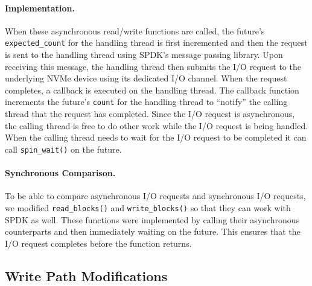 \paragraph{Implementation.}
When these asynchronous read/write functions are called, the future's {\tt
expected\_count} for the handling thread is first incremented and then the
request is sent to the handling thread using SPDK's message passing library.
Upon receiving this message, the handling thread then submits the I/O request
to the underlying NVMe device using its dedicated I/O channel. When the request
completes, a callback is executed on the handling thread. The callback function
increments the future's {\tt count} for the handling thread to ``notify'' the
calling thread that the request has completed. Since the I/O request is
asynchronous, the calling thread is free to do other work while the I/O request
is being handled. When the calling thread needs to wait for the I/O request to
be completed it can call {\tt spin\_wait()} on the future.

\paragraph{Synchronous Comparison.}
To be able to compare asynchronous I/O requests and synchronous I/O
requests, we modified {\tt read\_blocks()} and {\tt write\_blocks()} so that
they can work with SPDK as well. These functions were implemented by calling
their asynchronous counterparts and then immediately waiting on the future.
This ensures that the I/O request completes before the function returns.

\subsection{Write Path Modifications}\label{sec:writepath}
